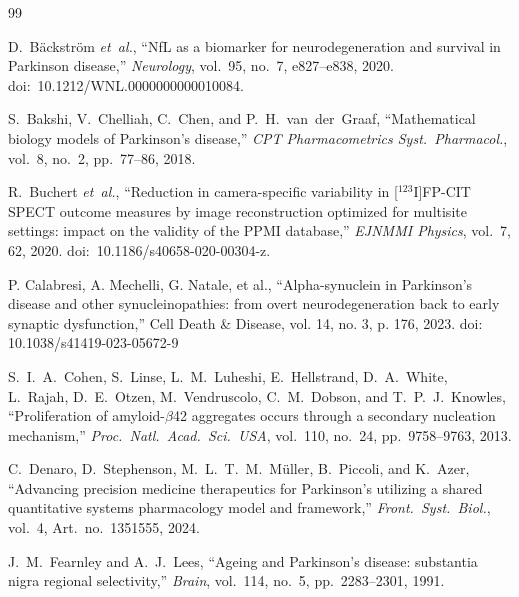 \begin{thebibliography}{99}

D.~B\"{a}ckstr\"{o}m \textit{et~al.}, ``NfL as a biomarker for neurodegeneration and survival in Parkinson disease,'' \textit{Neurology}, vol.~95, no.~7, e827--e838, 2020. doi:~10.1212/WNL.0000000000010084.

S.~Bakshi, V.~Chelliah, C.~Chen, and P.~H.~van~der~Graaf, ``Mathematical biology models of Parkinson's disease,'' \textit{CPT Pharmacometrics Syst.\ Pharmacol.}, vol.~8, no.~2, pp.~77--86, 2018.

R.~Buchert \textit{et~al.}, ``Reduction in camera-specific variability in [$^{123}$I]FP-CIT SPECT outcome measures by image reconstruction optimized for multisite settings: impact on the validity of the PPMI database,'' \textit{EJNMMI Physics}, vol.~7, 62, 2020. doi:~10.1186/s40658-020-00304-z.

 P. Calabresi, A. Mechelli, G. Natale, et al., ``Alpha-synuclein in Parkinson's disease and other synucleinopathies: from overt neurodegeneration back to early synaptic dysfunction,'' Cell Death \& Disease, vol. 14, no. 3, p. 176, 2023. doi: 10.1038/s41419-023-05672-9







S.~I.~A.~Cohen, S.~Linse, L.~M.~Luheshi, E.~Hellstrand, D.~A.~White, L.~Rajah, D.~E.~Otzen, M.~Vendruscolo, C.~M.~Dobson, and T.~P.~J.~Knowles, ``Proliferation of amyloid-$\beta$42 aggregates occurs through a secondary nucleation mechanism,'' \textit{Proc.\ Natl.\ Acad.\ Sci.\ USA}, vol.~110, no.~24, pp.~9758--9763, 2013.

C.~Denaro, D.~Stephenson, M.~L.~T.~M.~M{\"u}ller, B.~Piccoli, and K.~Azer, ``Advancing precision medicine therapeutics for Parkinson's utilizing a shared quantitative systems pharmacology model and framework,'' \textit{Front.\ Syst.\ Biol.}, vol.~4, Art.\ no.~1351555, 2024.

J.~M.~Fearnley and A.~J.~Lees, ``Ageing and Parkinson's disease: substantia nigra regional selectivity,'' \textit{Brain}, vol.~114, no.~5, pp.~2283--2301, 1991.


\end{thebibliography}

